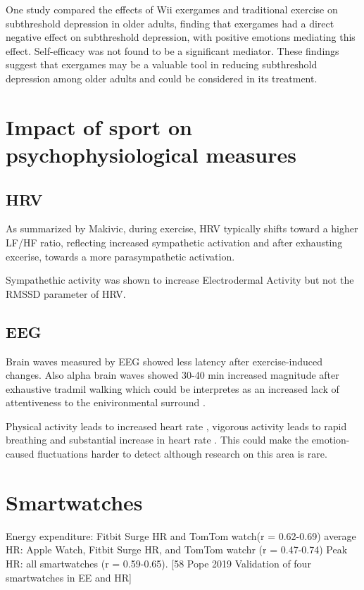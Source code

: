 One study compared the effects of Wii exergames and traditional exercise on subthreshold depression in older adults, finding that exergames had a direct negative effect on subthreshold depression, with positive emotions mediating this effect. Self-efficacy was not found to be a significant mediator. These findings suggest that exergames may be a valuable tool in reducing subthreshold depression among older adults and could be considered in its treatment. \cite{li17exergames}

\section{Impact of sport on psychophysiological measures}

\subsection{HRV}
As summarized by Makivic, during exercise, HRV typically shifts toward a higher LF/HF ratio, reflecting increased sympathetic activation and after exhausting excerise, towards a more parasympathetic activation.	\cite{makivic2013heart}

Sympathethic activity was shown to increase Electrodermal Activity but not the RMSSD  parameter of HRV.\cite{boettger2010heart}

\subsection{EEG}
Brain waves measured by EEG showed less latency after exercise-induced changes. \cite{reeves85endogenous} Also alpha brain waves showed 30-40 min increased magnitude after exhaustive tradmil walking which could be interpretes as an increased lack of attentiveness to the enivironmental surround \cite{hatfield87psychophysiology}.

Physical activity leads to increased heart rate \cite{hammond1985normal, boettger2010heart, haskell2007recommendation}, vigorous activity leads to rapid breathing and substantial increase in heart rate \cite{haskell2007recommendation}. This could make the emotion-caused fluctuations harder to detect although research on this area is rare.

\section{Smartwatches}
Energy expenditure: Fitbit Surge HR and TomTom watch(r = 0.62-0.69)
average HR: Apple Watch, Fitbit Surge HR, and TomTom watchr (r = 0.47-0.74)
Peak HR:  all smartwatches  (r = 0.59-0.65).  [58 Pope 2019 Validation of four smartwatches in EE and HR]

